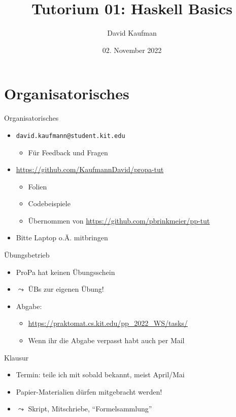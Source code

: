 \documentclass{beamer}
\title{Tutorium 01: Haskell Basics}
\author{David Kaufman}
\institute{Tutorium Programmierparadigmen am KIT}
\date{02. November 2022}
\begin{document}
\begin{frame}
        \titlepage
\end{frame}

\section{Organisatorisches}

\begin{frame}{Organisatorisches}
        \begin{itemize}
                \item \texttt{david.kaufmann@student.kit.edu}
                \begin{itemize}
                        \item Für Feedback und Fragen
                \end{itemize}
                \item \url{https://github.com/KaufmannDavid/propa-tut}
                \begin{itemize}
                        \item Folien
                        \item Codebeispiele
                        \item Übernommen von \url{https://github.com/pbrinkmeier/pp-tut}
                \end{itemize}
                \item Bitte Laptop o.Ä. mitbringen
        \end{itemize}
\end{frame}

\begin{frame}{Übungsbetrieb}
        \begin{itemize}
                \item ProPa hat keinen Übungsschein
                \item $\leadsto$ ÜBs zur eigenen Übung!
                \item Abgabe:
                \begin{itemize}
                  \item \url{https://praktomat.cs.kit.edu/pp_2022_WS/tasks/}
                  \item Wenn ihr die Abgabe verpasst habt auch per Mail
                \end{itemize}
        \end{itemize}
\end{frame}

\begin{frame}{Klausur}
        \begin{itemize}
                \item Termin: teile ich mit sobald bekannt, meist April/Mai
                \item Papier-Materialien dürfen mitgebracht werden!
                \item $\leadsto$ Skript, Mitschriebe, \enquote{Formelsammlung}
        \end{itemize}
\end{frame}
\end{document}
